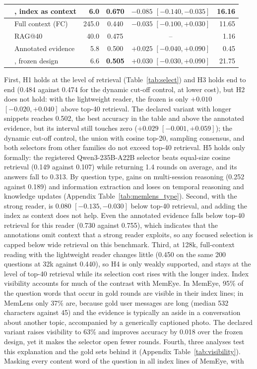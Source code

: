 \begin{table}[t]
\begin{tabular}{llrccr}
 & \qss{}, index as context & 6.0 & 0.670 & $-0.085$ $[-0.140, -0.035]$ & 16.16 \\
\midrule
{}
 & Full context (FC) & 245.0 & 0.440 & $-0.035$ $[-0.100, +0.030]$ & 11.65 \\
 & RAG@40 & 40.0 & 0.475 & -- & 1.16 \\
 & Annotated evidence & 5.8 & 0.500 & $+0.025$ $[-0.040, +0.090]$ & 0.45 \\
 & \qss{}, frozen design & 6.6 & \textbf{0.505} & $+0.030$ $[-0.030, +0.090]$ & 21.75 \\
\bottomrule
\end{tabular}
\end{table}

First, H1 holds at the level of retrieval (Table~\ref{tab:select}) and H3 holds end to end (0.484 against 0.474 for the dynamic cut-off control, at lower cost), but H2 does not hold: with the lightweight reader, the frozen \qss{} is only $+0.010$ $[-0.020, +0.040]$ above top-40 retrieval. The declared variant with longer snippets reaches 0.502, the best accuracy in the table and above the annotated evidence, but its interval still touches zero ($+0.029$ $[-0.001, +0.059]$); the dynamic cut-off control, the union with cosine top-20, sampling consensus, and both selectors from other families do not exceed top-40 retrieval. H5 holds only formally: the registered Qwen3-235B-A22B selector beats equal-size cosine retrieval (0.149 against 0.107) while returning 1.4 rounds on average, and its answers fall to 0.313. By question type, \qss{} gains on multi-session reasoning (0.252 against 0.189) and information extraction and loses on temporal reasoning and knowledge updates (Appendix Table~\ref{tab:memlens_type}). Second, with the strong reader, \qss{} is 0.080 $[-0.135, -0.030]$ below top-40 retrieval, and adding the index as context does not help. Even the annotated evidence falls below top-40 retrieval for this reader (0.730 against 0.755), which indicates that the annotations omit context that a strong reader exploits, so any focused selection is capped below wide retrieval on this benchmark. Third, at 128k, full-context reading with the lightweight reader changes little (0.450 on the same 200 questions at 32k against 0.440), so H4 is only weakly supported, and \qss{} stays at the level of top-40 retrieval while its selection cost rises with the longer index. Index visibility accounts for much of the contrast with MemEye. In MemEye, 95\% of the question words that occur in gold rounds are visible in their index lines; in MemLens only 37\% are, because gold user messages are long (median 532 characters against 45) and the evidence is typically an aside in a conversation about another topic, accompanied by a generically captioned photo. The declared variant raises visibility to 63\% and improves accuracy by 0.018 over the frozen design, yet it makes the selector open fewer rounds. Fourth, three analyses test this explanation and the gold sets behind it (Appendix Table~\ref{tab:visibility}). Masking every content word of the question in all index lines of MemEye, with 